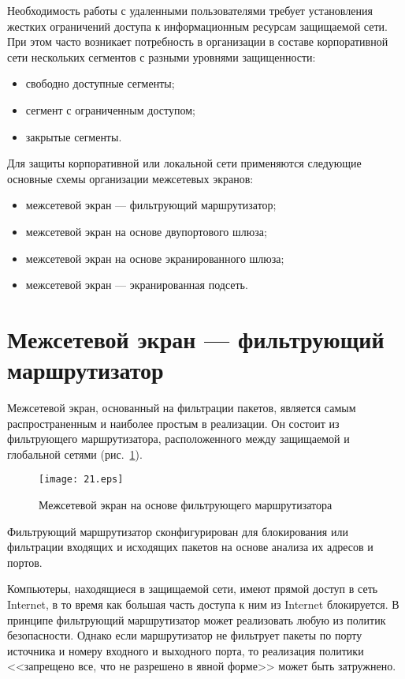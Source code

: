 Необходимость работы с удаленными пользователями требует установления
жестких ограничений доступа к информационным ресурсам защищаемой
сети. При этом часто возникает потребность в организации в составе
корпоративной сети нескольких сегментов с разными уровнями
защищенности:

\begin{itemize}
\item  свободно доступные сегменты;
\item   сегмент с ограниченным доступом;
\item   закрытые сегменты.
\end{itemize}

Для защиты корпоративной или локальной сети применяются следующие
основные схемы организации межсетевых экранов:

\begin{itemize}
\item  межсетевой экран --- фильтрующий маршрутизатор;
\item  межсетевой экран на основе двупортового шлюза;
\item  межсетевой экран на основе экранированного шлюза;
\item  межсетевой экран --- экранированная подсеть.
\end{itemize}

\section{Межсетевой экран  --- фильтрующий маршрутизатор}
Межсетевой экран, основанный на фильтрации пакетов, является самым
распространенным и наиболее простым в реализации. Он состоит из
фильтрующего маршрутизатора, расположенного между защищаемой и
глобальной сетями (рис.~\ref{fig:gor:2}).
\begin{center}
\begin{figure}[!htp]
\centerline{\texttt{[image: 21.eps]}}
\caption{Межсетевой экран на основе фильтрующего маршрутизатора}
\label{fig:gor:2}
\end{figure}
\end{center}

Фильтрующий маршрутизатор сконфигурирован для блокирования или
фильтрации входящих и исходящих пакетов на основе анализа их адресов и
портов.

Компьютеры, находящиеся в защищаемой сети, имеют прямой доступ в сеть
Internet, в то время как большая часть доступа к ним из Internet
блокируется. В принципе фильтрующий маршрутизатор может реализовать
любую из политик безопасности. Однако если маршрутизатор не фильтрует
пакеты по порту источника и номеру входного и выходного порта, то
реализация политики <<запрещено все, что не разрешено в явной форме>>
может быть затружнено.

